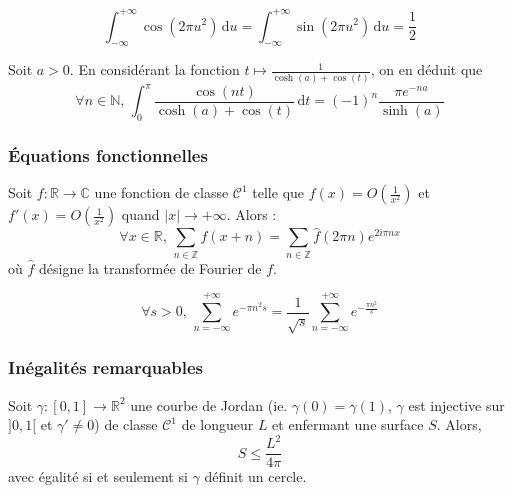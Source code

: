 	\begin{application}
		\[ \int_{-\infty}^{+\infty} \cos(2 \pi u^2) \, \mathrm{d}u = \int_{-\infty}^{+\infty} \sin(2 \pi u^2) \, \mathrm{d}u = \frac{1}{2} \]
	\end{application}


	\begin{application}
		Soit $a > 0$. En considérant la fonction $t \mapsto \frac{1}{\cosh(a) + \cos(t)}$, on en déduit que
		\[ \forall n \in \mathbb{N}, \, \int_{0}^{\pi} \frac{\cos(nt)}{\cosh(a) + \cos(t)} \, \mathrm{d}t = (-1)^n \frac{\pi e^{-na}}{\sinh(a)} \]
	\end{application}

	\subsubsection{Équations fonctionnelles}


	\begin{theorem}
		Soit $f : \mathbb{R} \rightarrow \mathbb{C}$ une fonction de classe $\mathcal{C}^1$ telle que $f(x) = O \left( \frac{1}{x^2} \right)$ et $f'(x) = O \left( \frac{1}{x^2} \right)$ quand $|x| \longrightarrow +\infty$. Alors :
		\[ \forall x \in \mathbb{R}, \, \sum_{n \in \mathbb{Z}} f(x+n) = \sum_{n \in \mathbb{Z}} \widehat{f}(2 \pi n) e^{2 i \pi n x} \]
		où $\widehat{f}$ désigne la transformée de Fourier de $f$.
	\end{theorem}

	\begin{application}
		\[ \forall s > 0, \, \sum_{n=-\infty}^{+\infty} e^{-\pi n^2 s} = \frac{1}{\sqrt{s}} \sum_{n=-\infty}^{+\infty} e^{-\frac{\pi n^2}{s}} \]
	\end{application}

	\subsubsection{Inégalités remarquables}


	\begin{application}
		Soit $\gamma : [0,1] \rightarrow \mathbb{R}^2$ une courbe de Jordan (ie. $\gamma(0) = \gamma(1)$, $\gamma$ est injective sur $]0,1[$ et $\gamma' \neq 0$) de classe $\mathcal{C}^1$ de longueur $L$ et enfermant une surface $S$. Alors,
		\[ S \leq \frac{L^2}{4 \pi} \]
		avec égalité si et seulement si $\gamma$ définit un cercle.
	\end{application}

